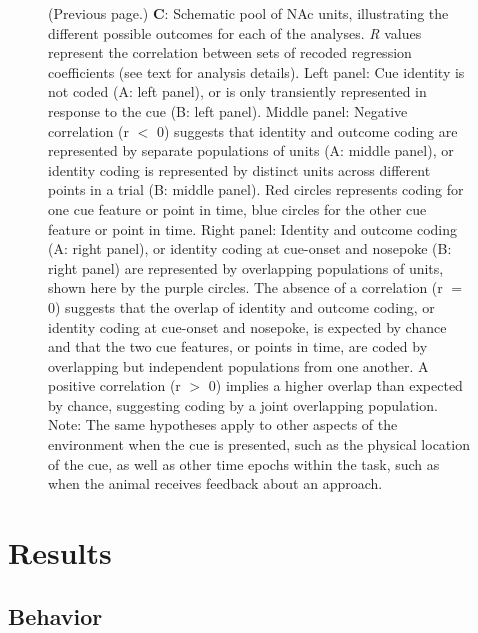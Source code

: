\documentclass[11pt]{article}
\newcommand{\bsf}[1]{\textbf{#1}}
\providecommand{\DIFaddend}{} %
\DeclareRobustCommand{\DIFaddend}{\DIFOaddend \let\includegraphics\DIFOincludegraphics} %
\begin{document}
\addtocounter{figure}{-1}
\begin{figure} [t!]
  \caption{(Previous page.) {\color{red} \bsf{C}: Schematic pool of NAc units, illustrating the different possible outcomes for each of the analyses. {\it R} values represent the correlation between sets of recoded regression coefficients (see text for analysis details). Left panel: Cue identity is not coded (A: left panel), or is only transiently represented in response to the cue (B: left panel). Middle panel: Negative correlation (r $<$ 0) suggests that identity and outcome coding are represented by separate populations of units (A: middle panel), or identity coding is represented by distinct units across different points in a trial (B: middle panel). Red circles represents coding for one cue feature or point in time, blue circles for the other cue feature or point in time. Right panel: Identity and outcome coding (A: right panel), or identity coding at cue-onset and nosepoke (B: right panel) are represented by overlapping populations of units, shown here by the purple circles. The absence of a correlation (r $=$ 0) suggests that the overlap of identity and outcome coding, or identity coding at cue-onset and nosepoke, is expected by chance and that the two cue features, or points in time, are coded by overlapping but independent populations from one another. A positive correlation (r $>$ 0) implies a higher overlap than expected by chance, suggesting coding by a joint overlapping population. Note: The same hypotheses apply to other aspects of the environment when the cue is presented, such as the physical location of the cue, as well as other time epochs within the task, such as when the animal receives feedback about an approach.}}
\end{figure}

\DIFaddend \section*{Results}

\subsection*{Behavior}
\end{document}
